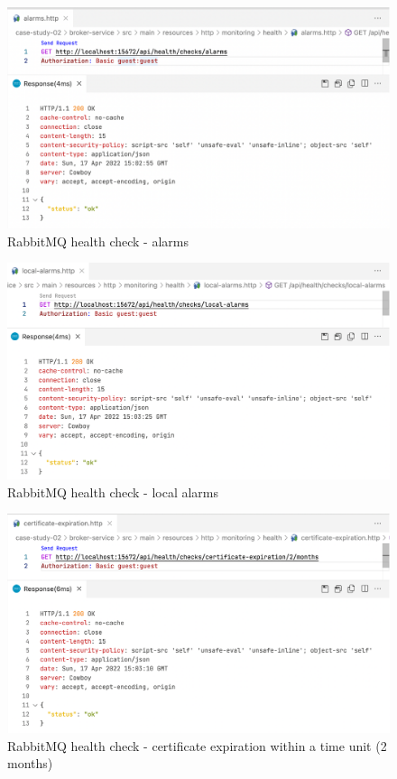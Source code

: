\begin{figure}[H]
	\centering
	\includegraphics[width=1.0\linewidth]{./assets/images/case-studies/cs02-hc1.png}
	\caption{RabbitMQ health check - alarms}
	\label{fig:cs02-hc1}
\end{figure}


\begin{figure}[H]
	\centering
	\includegraphics[width=1.0\linewidth]{./assets/images/case-studies/cs02-hc2.png}
	\caption{RabbitMQ health check - local alarms}
	\label{fig:cs02-hc2}
\end{figure}

\begin{figure}[H]
	\centering
	\includegraphics[width=1.0\linewidth]{./assets/images/case-studies/cs02-hc3.png}
	\caption{RabbitMQ health check - certificate expiration within a time unit (2 months)}
	\label{fig:cs02-hc3}
\end{figure}

